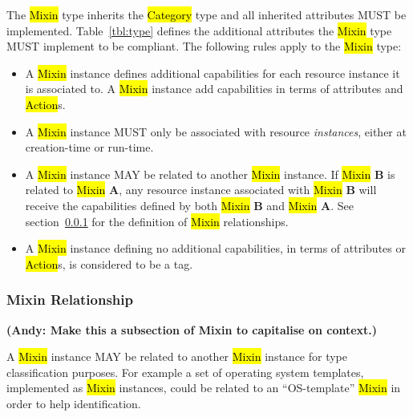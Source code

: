 \documentclass[10pt,a4paper]{article}
\begin{document}
The \hl{Mixin} type inherits the \hl{Category} type and all inherited
attributes MUST be implemented. Table~\ref{tbl:type} defines the
additional attributes the \hl{Mixin} type MUST implement to be compliant.
The following rules apply to the \hl{Mixin} type:
\begin{itemize}
\item A \hl{Mixin} instance defines additional capabilities for each
 resource instance it is associated to. A \hl{Mixin} instance
 add capabilities in terms of attributes and \hl{Action}s.
\item A \hl{Mixin} instance MUST only be associated with resource
 {\em instances}, either at creation-time or run-time.
\item A \hl{Mixin} instance MAY be related to another \hl{Mixin} instance.
 If \hl{Mixin} {\bf B} is related to \hl{Mixin} {\bf A}, any resource instance
 associated with \hl{Mixin} {\bf B} will receive the capabilities defined by
 both \hl{Mixin} {\bf B} and \hl{Mixin} {\bf A}.
 See section~\ref{sec:mixin_relationship} for the definition of \hl{Mixin}
 relationships.
\item A \hl{Mixin} instance defining no additional capabilities, in terms
 of attributes or \hl{Action}s, is considered to be a tag.
\end{itemize}

\subsubsection{Mixin Relationship}
\label{sec:mixin_relationship}

\textbf{(Andy: Make this a subsection of Mixin to capitalise on context.)}

A \hl{Mixin} instance MAY be related to another \hl{Mixin} instance for
type classification purposes. For example a set of operating system templates,
implemented as \hl{Mixin} instances, could be related to an ``OS-template''
\hl{Mixin} in order to help identification.
\end{document}
